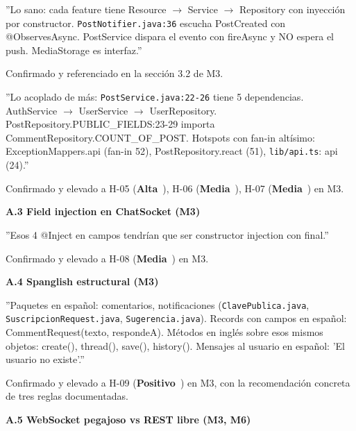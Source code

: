 \documentclass[10pt,a4paper]{article}
\newcommand{\code}[1]{\nolinkurl{#1}}
\newcommand{\badgeAlta}{\colorbox{orange!20}{\textcolor{orange!90!black}{\textbf{\footnotesize Alta}}}}
\newcommand{\badgeMedia}{\colorbox{yellow!35}{\textcolor{brown!90!black}{\textbf{\footnotesize Media}}}}
\newcommand{\badgePositivo}{\colorbox{green!20}{\textcolor{green!60!black}{\textbf{\footnotesize Positivo}}}}
\begin{document}
''Lo sano: cada feature tiene Resource $\rightarrow$ Service $\rightarrow$ Repository con inyección por constructor. \code{PostNotifier.java:36} escucha PostCreated con @ObservesAsync. PostService dispara el evento con fireAsync y NO espera el push. MediaStorage es interfaz.''\par\vspace{0.4em}
Confirmado y referenciado en la sección 3.2 de M3.\par\vspace{0.4em}
''Lo acoplado de más: \code{PostService.java:22-26} tiene 5 dependencias. AuthService $\rightarrow$ UserService $\rightarrow$ UserRepository. PostRepository.PUBLIC\_FIELDS:23-29 importa CommentRepository.COUNT\_OF\_POST. Hotspots con fan-in altísimo: ExceptionMappers.api (fan-in 52), PostRepository.react (51), \code{lib/api.ts}: api (24).''\par\vspace{0.4em}
Confirmado y elevado a H-05 (\badgeAlta\ ), H-06 (\badgeMedia\ ), H-07 (\badgeMedia\ ) en M3.\par\vspace{0.4em}
\vspace{0.6em}\noindent\textbf{\normalsize A.3 Field injection en ChatSocket (M3)}\par\vspace{0.2em}
''Esos 4 @Inject en campos tendrían que ser constructor injection con final.''\par\vspace{0.4em}
Confirmado y elevado a H-08 (\badgeMedia\ ) en M3.\par\vspace{0.4em}
\vspace{0.6em}\noindent\textbf{\normalsize A.4 Spanglish estructural (M3)}\par\vspace{0.2em}
''Paquetes en español: comentarios, notificaciones (\code{ClavePublica.java}, \code{SuscripcionRequest.java}, \code{Sugerencia.java}). Records con campos en español: CommentRequest(texto, respondeA). Métodos en inglés sobre esos mismos objetos: create(), thread(), save(), history(). Mensajes al usuario en español: 'El usuario no existe'.''\par\vspace{0.4em}
Confirmado y elevado a H-09 (\badgePositivo\ ) en M3, con la recomendación concreta de tres reglas documentadas.\par\vspace{0.4em}
\vspace{0.6em}\noindent\textbf{\normalsize A.5 WebSocket pegajoso vs REST libre (M3, M6)}\par\vspace{0.2em}
\end{document}
